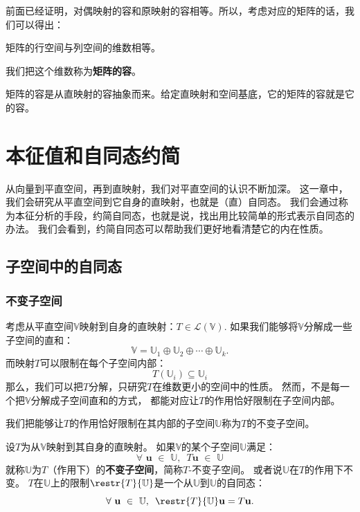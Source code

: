 \documentclass[12pt,UTF8]{ctexbook}
\begin{document}
前面已经证明，对偶映射的容和原映射的容相等。所以，考虑对应的矩阵的话，我们可以得出：

\begin{pp}\label{pp:5_5}
矩阵的行空间与列空间的维数相等。
\end{pp}
我们把这个维数称为\textbf{矩阵的容}。

矩阵的容是从直映射的容抽象而来。给定直映射和空间基底，它的矩阵的容就是它的容。

\chapter{本征值和自同态约简}
从向量到平直空间，再到直映射，我们对平直空间的认识不断加深。
这一章中，我们会研究从平直空间到它自身的直映射，也就是（直）自同态。
我们会通过称为本征分析的手段，约简自同态，也就是说，找出用比较简单的形式表示自同态的办法。
我们会看到，约简自同态可以帮助我们更好地看清楚它的内在性质。

\begin{center}
\end{center}

\section{子空间中的自同态}
\subsection{不变子空间}
考虑从平直空间$\mathbb{V}$映射到自身的直映射：$T \in \mathcal{L}(\mathbb{V})$. 
如果我们能够将$\mathbb{V}$分解成一些子空间的直和：
$$ \mathbb{V} = \mathbb{U}_1 \oplus \mathbb{U}_2 \oplus \cdots \oplus \mathbb{U}_k. $$
而映射$T$可以限制在每个子空间内部：
$$ T(\mathbb{U}_i) \subseteq \mathbb{U}_i$$
那么，我们可以把$T$分解，只研究$T$在维数更小的空间中的性质。
然而，不是每一个把$\mathbb{V}$分解成子空间直和的方式，
都能对应让$T$的作用恰好限制在子空间内部。

我们把能够让$T$的作用恰好限制在其内部的子空间$\mathbb{U}$称为$T$的不变子空间。

\begin{df}\label{df:6_1}
    设$T$为从$\mathbb{V}$映射到其自身的直映射。
    如果$\mathbb{V}$的某个子空间$\mathbb{U}$满足： 
    $$ \forall \,\, \mathbf{u} \,\, \in \,\, \mathbb{U}, \,\,\, T\mathbf{u} \,\, \in \,\, \mathbb{U} $$
    就称$\mathbb{U}$为$T$（作用下）的\textbf{不变子空间}，简称$T$-不变子空间。
    或者说$\mathbb{U}$在$T$的作用下不变。
    $T$在$\mathbb{U}$上的限制$\restr{T}{\mathbb{U}}$是一个从$\mathbb{U}$到$\mathbb{U}$的自同态：
    $$ \forall \,\, \mathbf{u} \,\, \in \,\, \mathbb{U}, \,\,\, \restr{T}{\mathbb{U}}\mathbf{u} = T\mathbf{u}. $$
\end{df}
\end{document}

